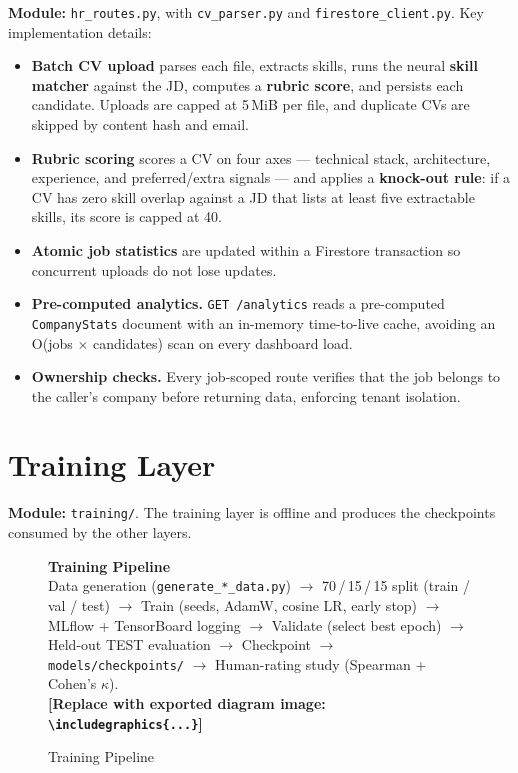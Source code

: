 \documentclass[12pt,a4paper,oneside]{report}
\newcommand{\diagramplaceholder}[1]{%
  \begin{tcolorbox}[
    colback=gray!5, colframe=gray!50,
    boxrule=0.4pt, arc=2pt,
    left=10pt, right=10pt, top=8pt, bottom=8pt,
    fontupper=\small\itshape
  ]
  \centering #1\\[4pt]
  \textbf{[Replace with exported diagram image: \texttt{\textbackslash includegraphics\{...\}}]}
  \end{tcolorbox}%
}
\begin{document}
\textbf{Module:} \texttt{hr\_routes.py}, with \texttt{cv\_parser.py} and
\texttt{firestore\_client.py}. Key implementation details:

\begin{itemize}
  \item \textbf{Batch CV upload} parses each file, extracts skills, runs the neural
    \textbf{skill matcher} against the JD, computes a \textbf{rubric score}, and persists each
    candidate. Uploads are capped at 5\,MiB per file, and duplicate CVs are skipped by content
    hash and email.
  \item \textbf{Rubric scoring} scores a CV on four axes --- technical stack, architecture,
    experience, and preferred/extra signals --- and applies a \textbf{knock-out rule}: if a CV
    has zero skill overlap against a JD that lists at least five extractable skills, its score
    is capped at 40.
  \item \textbf{Atomic job statistics} are updated within a Firestore transaction so concurrent
    uploads do not lose updates.
  \item \textbf{Pre-computed analytics.} \texttt{GET /analytics} reads a pre-computed
    \texttt{CompanyStats} document with an in-memory time-to-live cache, avoiding an
    O(jobs $\times$ candidates) scan on every dashboard load.
  \item \textbf{Ownership checks.} Every job-scoped route verifies that the job belongs to the
    caller's company before returning data, enforcing tenant isolation.
\end{itemize}

\section{Training Layer}

\textbf{Module:} \texttt{training/}. The training layer is offline and produces the
checkpoints consumed by the other layers.

\begin{figure}[H]
\centering
\diagramplaceholder{%
  \textbf{Training Pipeline}\\
  Data generation (\texttt{generate\_*\_data.py}) $\to$ 70\,/\,15\,/\,15 split (train / val / test) $\to$
  Train (seeds, AdamW, cosine LR, early stop) $\to$ MLflow + TensorBoard logging $\to$
  Validate (select best epoch) $\to$ Held-out TEST evaluation $\to$
  Checkpoint $\to$ \texttt{models/checkpoints/} $\to$ Human-rating study (Spearman + Cohen's $\kappa$).%
}
\caption{Training Pipeline}
\label{fig:training}
\end{figure}
\end{document}
